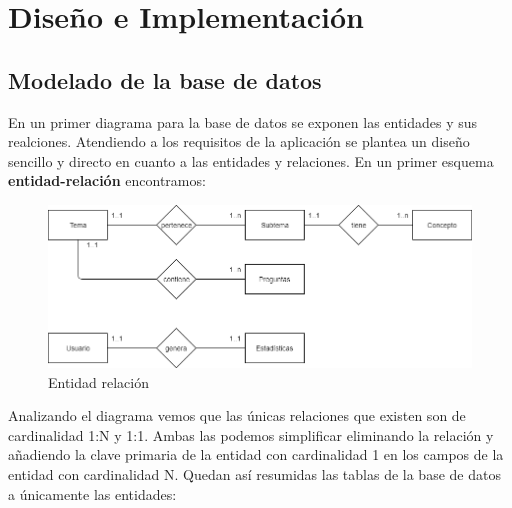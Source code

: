 \chapter{Diseño e Implementación}


\section{Modelado de la base de datos}
En un primer diagrama para la base de datos se exponen las entidades y sus realciones. Atendiendo a los requisitos de la aplicación se plantea un diseño sencillo y directo en cuanto a las entidades y relaciones. En un primer esquema \textbf{entidad-relación} encontramos:



\begin{figure}[!ht]
  \begin{center}
    \includegraphics[width=1\textwidth]{../images/entidad_relacion.png}
    \caption{Entidad relación}
    \label{fig:entidad_relacion}
  \end{center}
\end{figure}


\bigskip
Analizando el diagrama vemos que las únicas relaciones que existen son de cardinalidad 1:N y 1:1.
Ambas las podemos simplificar eliminando la relación y añadiendo la clave primaria de la entidad con cardinalidad 1 en los campos de la entidad con cardinalidad N. Quedan así resumidas las tablas de la base de datos a únicamente las entidades:

